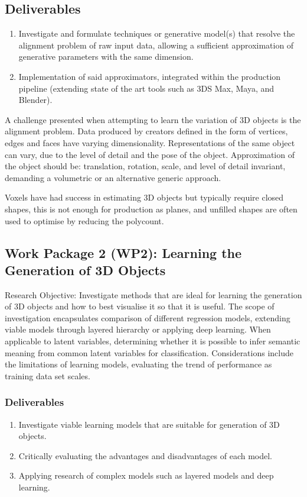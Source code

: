 \documentclass[a4paper, fontsize=15pt, onecolumn]{article} %
\numberwithin{equation}{section} %
\numberwithin{figure}{section} %
\numberwithin{table}{section} %
\begin{document}
\subsection{Deliverables}
\begin{enumerate}
	\item Investigate and formulate techniques or generative model(s) that resolve the alignment problem of raw input data, allowing a sufficient approximation of generative parameters with the same dimension.
	\item Implementation of said approximators, integrated within the production pipeline (extending state of the art tools such as 3DS Max, Maya, and Blender).
\end{enumerate}

A challenge presented when attempting to learn the variation of 3D objects is the alignment problem. Data produced by creators defined in the form of vertices, edges and faces have varying dimensionality. Representations of the same object can vary, due to the level of detail and the pose of the object. Approximation of the object should be: translation, rotation, scale, and level of detail invariant, demanding a volumetric or an alternative generic approach.

Voxels have had success in estimating 3D objects but typically require closed shapes, this is not enough for production as planes, and unfilled shapes are often used to optimise by reducing the polycount.

\subsection{Work Package 2 (WP2): Learning the Generation of 3D Objects}

Research Objective: Investigate methods that are ideal for learning the generation of 3D objects and how to best visualise it so that it is useful. The scope of investigation encapsulates comparison of different regression models, extending viable models through layered hierarchy or applying deep learning. When applicable to latent variables, determining whether it is possible to infer semantic meaning from common latent variables for classification. Considerations include the limitations of learning models, evaluating the trend of performance as training data set scales.

\subsubsection{Deliverables} 
\begin{enumerate}
	\item Investigate viable learning models that are suitable for generation of 3D objects.
	\item Critically evaluating the advantages and disadvantages of each model.
	\item Applying research of complex models such as layered models and deep learning.
\end{enumerate}
\end{document}
